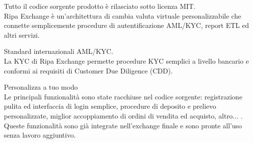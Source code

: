 \documentclass[11pt,fleqn,oneside]{book} %
\begin{document}
\begin{tcolorbox}[featureBox,
	title=\textsc{Open Source}]

	\small	Tutto il codice sorgente prodotto è rilasciato sotto licenza MIT.\\\vspace{5mm}
	\tiny Ripa Exchange è un'architettura di cambia valuta virtuale personalizzabile che connette semplicemente procedure
	di autentificazione AML/KYC, report ETL ed altri servizi.
\end{tcolorbox}
\begin{tcolorbox}[featureBox,
	title=\textsc{Conforme}]

	\small Standard internazionali AML/KYC.\\\vspace{5mm}
	\tiny La KYC di Ripa Exchange permette procedure KYC semplici a livello bancario e conformi ai requisiti di 
	Customer Due Diligence (CDD).
\end{tcolorbox}
\begin{tcolorbox}[featureBox,
	title=\textsc{Trasparente e Configurabile}]

	\small Personalizza a tuo modo\\\vspace{5mm}
	\tiny Le principali funzionalità sono state racchiuse nel codice sorgente: registrazione pulita ed 
	interfaccia di login semplice, procedure di deposito e prelievo personalizzate, miglior accoppiamento di ordini 
	di vendita ed acquisto, altro... . Queste funzionalità sono già integrate nell'exchange finale e sono pronte all'uso
	senza lavoro aggiuntivo. 
\end{tcolorbox}
\end{document}
